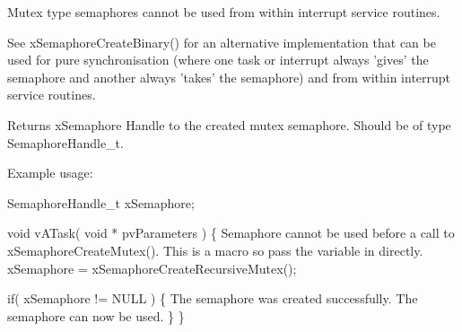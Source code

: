 Mutex type semaphores cannot be used from within interrupt service routines.

See x\-Semaphore\-Create\-Binary() for an alternative implementation that can be used for pure synchronisation (where one task or interrupt always 'gives' the semaphore and another always 'takes' the semaphore) and from within interrupt service routines.

\begin{DoxyReturn}{Returns}
x\-Semaphore Handle to the created mutex semaphore. Should be of type Semaphore\-Handle\-\_\-t.
\end{DoxyReturn}
Example usage\-: 
\begin{DoxyPre}
 SemaphoreHandle\_t xSemaphore;\end{DoxyPre}



\begin{DoxyPre} void vATask( void * pvParameters )
 \{
Semaphore cannot be used before a call to xSemaphoreCreateMutex().
This is a macro so pass the variable in directly.
    xSemaphore = xSemaphoreCreateRecursiveMutex();\end{DoxyPre}



\begin{DoxyPre}    if( xSemaphore != NULL )
    \{
The semaphore was created successfully.
The semaphore can now be used.
    \}
 \}
 \end{DoxyPre}
 